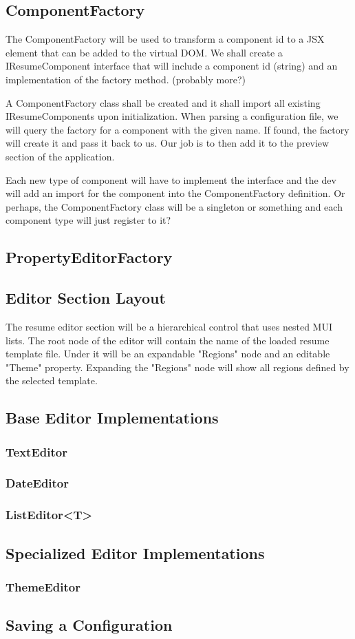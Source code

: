 \documentclass[12pt]{article}
\begin{document}
    \subsection{ComponentFactory}
    The ComponentFactory will be used to transform a component id to a JSX element that 
    can be added to the virtual DOM. We shall create a IResumeComponent interface
    that will include a component id (string) and an implementation of the factory method.
    (probably more?)

    A ComponentFactory class shall be created and it shall import all existing 
    IResumeComponents upon initialization. When parsing a configuration file, we 
    will query the factory for a component with the given name. If found, the factory 
    will create it and pass it back to us. Our job is to then add it to the preview 
    section of the application. 

    Each new type of component will have to implement the interface and the dev will add 
    an import for the component into the ComponentFactory definition. Or perhaps, the 
    ComponentFactory class will be a singleton or something and each component type will 
    just register to it? 

    \subsection{PropertyEditorFactory}


    \subsection{Editor Section Layout}
    The resume editor section will be a hierarchical control that uses nested MUI lists.
    The root node of the editor will contain the name of the loaded resume template file. 
    Under it will be an expandable "Regions" node and an editable "Theme" property. Expanding 
    the "Regions" node will show all regions defined by the selected template.

    \subsection{Base Editor Implementations}
    \subsubsection{TextEditor}

    \subsubsection{DateEditor}

    \subsubsection{ListEditor<T>}

    \subsection{Specialized Editor Implementations}
    \subsubsection{ThemeEditor}

    \subsection{Saving a Configuration}
\end{document}
